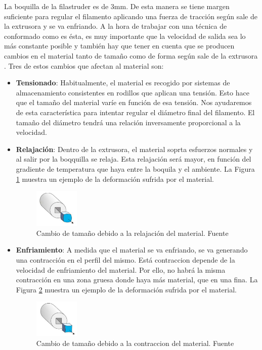 La boquilla de la filastruder es de 3mm. De esta manera se tiene margen suficiente para regular el filamento aplicando una fuerza de tracción según sale de la extrusora y se va enfriando. A la hora de trabajar con una técnica de conformado como es ésta, es muy importante que la velocidad de salida sea lo más constante posible y también hay que tener en cuenta que se producen cambios en el material tanto de tamaño como de forma según sale de la extrusora \cite{tecno_polimeros}. Tres de estos cambios que afectan al material son: 

\begin{itemize}
	\item {\textbf{Tensionado}: Habitualmente, el material es recogido por sistemas de almacenamiento consistentes en rodillos que aplican una tensión. Esto hace que el tamaño del material varíe en función de esa tensión. Nos ayudaremos de esta característica para intentar regular el diámetro final del filamento. El tamaño del diámetro tendrá una relación inversamente proporcional a la velocidad.}
	\item {\textbf{Relajación}: Dentro de la extrusora, el material soprta esfuerzos normales y  al salir por la boqquilla se relaja. Esta relajación será mayor, en función del gradiente de temperatura que haya entre la boquila y el ambiente. La Figura \ref{fig:prod_relajacion} muestra un ejemplo de la deformación sufrida por el material.
		\begin{figure}[H]
	        \centering
	        \includegraphics[width=0.2\textwidth]{images/producciones/relajacion.png}
	        \caption[Cambio de tamaño debido a la relajación del material.]{Cambio de tamaño debido a la relajación del material. Fuente \cite{tecno_polimeros}}
	        \label{fig:prod_relajacion}
		\end{figure}
	}
	\item {\textbf{Enfriamiento}: A medida que el material se va enfriando, se va generando una contracción en el perfil del mismo. Está contraccion depende de la velocidad de enfriamiento del material. Por ello, no habrá la misma contracción en una zona gruesa donde haya más material, que en una fina. La Figura \ref{fig:prod_contraccion} muestra un ejemplo de la deformación sufrida por el material.
		\begin{figure}[H]
	        \centering
	        \includegraphics[width=0.2\textwidth]{images/producciones/contraccion.png}
	        \caption[Cambio de tamaño debido a la contraccion del material.]{Cambio de tamaño debido a la contraccion del material. Fuente \cite{tecno_polimeros}}
	        \label{fig:prod_contraccion}
		\end{figure}
	}
\end{itemize}

